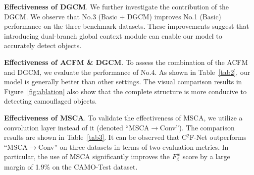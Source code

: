 \documentclass{article}
\begin{document}
\begin{figure}[h]
    \vspace{-0.25cm}
\end{figure}

\textbf{Effectiveness of DGCM}. We further investigate the contribution of the DGCM. We observe that No.3 (Basic + DGCM) improves No.1 (Basic) performance on the three benchmark datasets. These improvements suggest that introducing dual-branch global context module can enable our model to accurately detect objects.

\textbf{Effectiveness of ACFM \& DGCM}. To assess the combination of the ACFM and DGCM, we evaluate the performance of No.4. As shown in Table~\ref{tab2}, our model is generally better than other settings. The visual comparison results in Figure~\ref{fig:ablation} also show that the complete structure is more conducive to detecting camouflaged objects.

\textbf{Effectiveness of MSCA}. To validate the effectiveness of MSCA, we utilize a convolution layer instead of it (denoted ``MSCA$\rightarrow$Conv''). The comparison results are shown in Table~\ref{tab3}. It can be observed that C$^2$F-Net outperforms ``MSCA$\rightarrow$Conv'' on three datasets in terms of two evaluation metrics. In particular, the use of MSCA significantly improves the $F_\beta^w$ score by a large margin of 1.9\% on the CAMO-Test dataset.

\begin{table}[th]
\caption{Ablation study on MSCA.}\vspace{-0.25cm}
\label{tab3}
\end{table}
\end{document}
